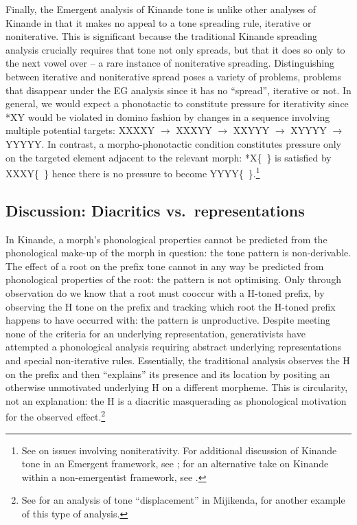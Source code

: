  
Finally, the Emergent analysis of Kinande tone is unlike other analyses of Kinande in that it makes no appeal to a tone spreading rule, iterative or noniterative. This is significant because the traditional Kinande spreading analysis crucially requires that tone not only spreads, but that it does so only to the next vowel over -- a rare instance of noniterative spreading. Distinguishing between iterative and noniterative spread poses a variety of problems, problems that disappear under the EG analysis since it has no ``spread'', iterative or not. In general, we would expect a phonotactic to constitute pressure for iterativity since *XY would be violated in domino fashion by changes in a sequence involving multiple potential targets: XXXXY $\rightarrow$ XXXYY $\rightarrow$ XXYYY $\rightarrow$ XYYYY $\rightarrow$ YYYYY. In contrast, a morpho-phonotactic condition constitutes pressure only on the targeted element adjacent to the relevant morph: *X\{~\} is satisfied by XXXY\{~\} hence there is no pressure to become YYYY\{~\}.\footnote{See \citet{Kaplan:2008} on issues involving noniterativity. For additional discussion of Kinande tone in an Emergent framework, see \citet{Archangeli+:2015_K-tone, Archangeli+:2014abidjan}; for an alternative take on Kinande within a non-emergentist framework, see \citet{Jones:2014}.}




\subsection{Discussion: Diacritics vs.\ representations}

In Kinande, a morph's phonological properties cannot be predicted from the phonological make-up of the morph in question: the tone pattern is non-derivable. The effect of a root  on the prefix tone cannot in any way be predicted from  phonological properties of the root: the pattern is not optimising. Only through observation do we know that a root must cooccur with a H-toned prefix, by observing the H tone on the prefix and tracking which root the H-toned prefix happens to have occurred with: the pattern is unproductive. Despite meeting none of the criteria for an underlying representation, generativists have attempted a phonological analysis requiring abstract underlying representations and special non-iterative rules. Essentially, the traditional analysis  observes the H on the prefix and then ``explains'' its presence and its location by positing an otherwise unmotivated underlying H on a different morpheme. This is circularity, not an explanation: the H is a diacritic masquerading as phonological motivation for the observed effect.\footnote{See \citet{Hyman:2018} for an analysis of tone ``displacement'' in Mijikenda, for another example of this type of analysis.}  

